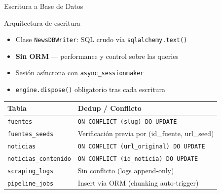 \documentclass[11pt,aspectratio=169,spanish]{beamer}
\begin{document}
\begin{frame}{Escritura a Base de Datos}
    \begin{block}{Arquitectura de escritura}
        \begin{itemize}
            \item Clase \texttt{NewsDBWriter}: SQL crudo vía \texttt{sqlalchemy.text()}
            \item \textbf{Sin ORM} — performance y control sobre las queries
            \item Sesión asíncrona con \texttt{async\_sessionmaker}
            \item \texttt{engine.dispose()} obligatorio tras cada escritura
        \end{itemize}
    \end{block}

    \vspace{0.3cm}
    \begin{table}[h]
    \small
    \begin{tabular}{ll}
        \toprule
        \textbf{Tabla} & \textbf{Dedup / Conflicto} \\
        \midrule
        \texttt{fuentes} & \texttt{ON CONFLICT (slug) DO UPDATE} \\
        \texttt{fuentes\_seeds} & Verificación previa por (id\_fuente, url\_seed) \\
        \texttt{noticias} & \texttt{ON CONFLICT (url\_original) DO UPDATE} \\
        \texttt{noticias\_contenido} & \texttt{ON CONFLICT (id\_noticia) DO UPDATE} \\
        \texttt{scraping\_logs} & Sin conflicto (logs append-only) \\
        \texttt{pipeline\_jobs} & Insert via ORM (chunking auto-trigger) \\
        \bottomrule
    \end{tabular}
    \end{table}
\end{frame}
\end{document}
